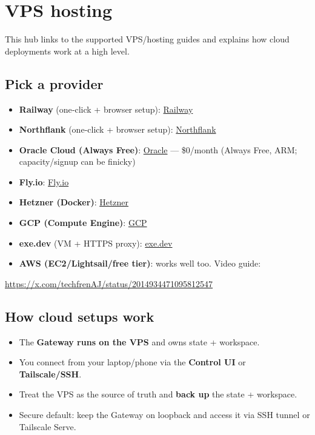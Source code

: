 \clearpage

\section{VPS hosting}


This hub links to the supported VPS/hosting guides and explains how cloud
deployments work at a high level.

\subsection{Pick a provider}


\begin{itemize}
  \item \textbf{Railway} (one‑click + browser setup): \href{/install/railway}{Railway}
  \item \textbf{Northflank} (one‑click + browser setup): \href{/install/northflank}{Northflank}
  \item \textbf{Oracle Cloud (Always Free)}: \href{/platforms/oracle}{Oracle} — \$0/month (Always Free, ARM; capacity/signup can be finicky)
  \item \textbf{Fly.io}: \href{/install/fly}{Fly.io}
  \item \textbf{Hetzner (Docker)}: \href{/install/hetzner}{Hetzner}
  \item \textbf{GCP (Compute Engine)}: \href{/install/gcp}{GCP}
  \item \textbf{exe.dev} (VM + HTTPS proxy): \href{/install/exe-dev}{exe.dev}
  \item \textbf{AWS (EC2/Lightsail/free tier)}: works well too. Video guide:
\end{itemize}

\href{https://x.com/techfrenAJ/status/2014934471095812547}{https://x.com/techfrenAJ/status/2014934471095812547}

\subsection{How cloud setups work}


\begin{itemize}
  \item The \textbf{Gateway runs on the VPS} and owns state + workspace.
  \item You connect from your laptop/phone via the \textbf{Control UI} or \textbf{Tailscale/SSH}.
  \item Treat the VPS as the source of truth and \textbf{back up} the state + workspace.
  \item Secure default: keep the Gateway on loopback and access it via SSH tunnel or Tailscale Serve.
\end{itemize}


